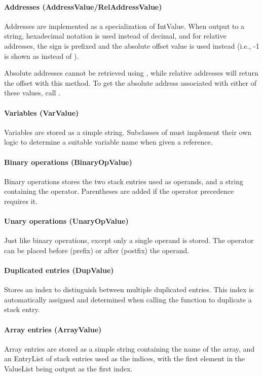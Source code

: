 \paragraph{Addresses (AddressValue/RelAddressValue)}
Addresses are implemented as a specialization of IntValue. When output to a string, hexadecimal notation is used instead of decimal, and for relative addresses, the sign is prefixed and the absolute offset value is used instead (i.e., -1 is shown as  instead of ).

Absolute addresses cannot be retrieved using , while relative addresses will return the offset with this method. To get the absolute address associated with either of these values, call .

\paragraph{Variables (VarValue)}
Variables are stored as a simple string. Subclasses of  must implement their own logic to determine a suitable variable name when given a reference.

\paragraph{Binary operations (BinaryOpValue)}
Binary operations stores the two stack entries used as operands, and a string containing the operator. Parentheses are added if the operator precedence requires it.

\paragraph{Unary operations (UnaryOpValue)}
Just like binary operations, except only a single operand is stored. The operator can be placed before (prefix) or after (postfix) the operand.

\paragraph{Duplicated entries (DupValue)}
Stores an index to distinguish between multiple duplicated entries. This index is automatically assigned and determined when calling the  function to duplicate a stack entry.

\paragraph{Array entries (ArrayValue)}
Array entries are stored as a simple string containing the name of the array, and an EntryList of stack entries used as the indices, with the first element in the ValueList being output as the first index.

